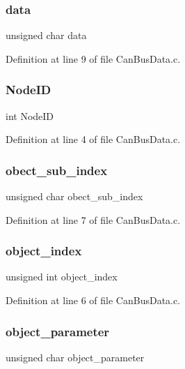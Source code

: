 \subsubsection{data}
{\footnotesize\ttfamily unsigned char data}



Definition at line 9 of file Can\+Bus\+Data.\+c.

\mbox{\label{structsdo_afc0fa9a29cd775046e94787eb1fccee5}} 
\subsubsection{Node\+ID}
{\footnotesize\ttfamily int Node\+ID}



Definition at line 4 of file Can\+Bus\+Data.\+c.

\mbox{\label{structsdo_a66ca074088e8abf2aebd9172ef3c96e2}} 
\subsubsection{obect\+\_\+sub\+\_\+index}
{\footnotesize\ttfamily unsigned char obect\+\_\+sub\+\_\+index}



Definition at line 7 of file Can\+Bus\+Data.\+c.

\mbox{\label{structsdo_afbcc2b4ae04ff607e2b937f406b8b5e7}} 
\subsubsection{object\+\_\+index}
{\footnotesize\ttfamily unsigned int object\+\_\+index}



Definition at line 6 of file Can\+Bus\+Data.\+c.

\mbox{\label{structsdo_a283774c36ecaaa7441ce05d685298259}} 
\subsubsection{object\+\_\+parameter}
{\footnotesize\ttfamily unsigned char object\+\_\+parameter}



